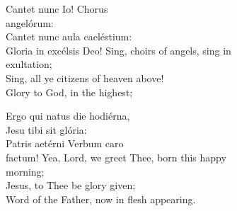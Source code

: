  Cantet nunc Io! Chorus\\
	\phantom{tab} angelórum:\\
	Cantet nunc aula caeléstium:\\
Gloria in excélsis Deo!
\divverse
Sing, choirs of angels, sing in\\
	\phantom{tab} exultation;\\
	Sing, all ye citizens of heaven above!\\
	Glory to God, in the highest;
\finishverse


Ergo qui natus die hodiérna,\\
Jesu tibi sit glória:\\
Patris aetérni Verbum caro\\
	\phantom{tab} factum!
\divverse
Yea, Lord, we greet Thee, born this happy\\
	\phantom{tab} morning;\\
Jesus, to Thee be glory given;\\
Word of the Father, now in flesh appearing.
\finishverse

\bigskip



